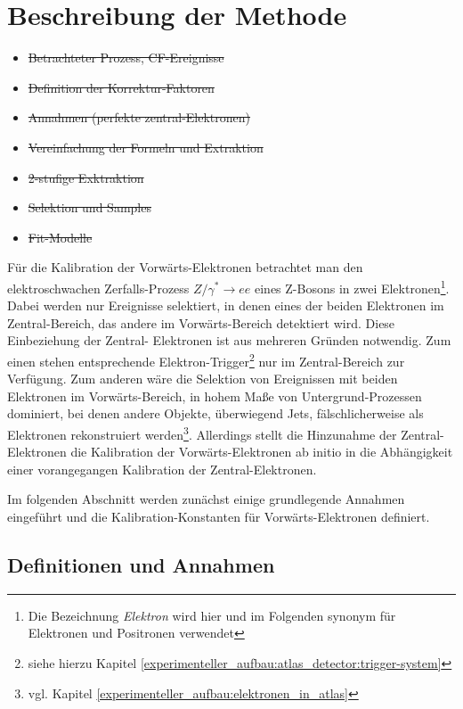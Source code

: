 \section{Beschreibung der Methode}
\label{energy_calibration:beschreibung_der_methode}

\begin{itemize}
    \item \sout{Betrachteter Prozess, CF-Ereignisse}
    \item \sout{Definition der Korrektur-Faktoren}
    \item \sout{Annahmen (perfekte zentral-Elektronen)}
    \item \sout{Vereinfachung der Formeln und Extraktion}
    \item \sout{2-stufige Exktraktion}
    \item \sout{Selektion und Samples}
    \item \sout{Fit-Modelle}
\end{itemize}

Für die Kalibration der Vorwärts-Elektronen betrachtet man den elektroschwachen
Zerfalls-Prozess $Z/\gamma^* \rightarrow ee$ eines Z-Bosons in zwei
Elektronen\footnote{Die Bezeichnung \textit{Elektron} wird hier und im
Folgenden synonym für Elektronen und Positronen verwendet}. Dabei werden nur
Ereignisse selektiert, in denen eines der beiden Elektronen im Zentral-Bereich,
das andere im Vorwärts-Bereich detektiert wird. Diese Einbeziehung der Zentral-
Elektronen ist aus mehreren Gründen notwendig. Zum einen stehen entsprechende
Elektron-Trigger\footnote{siehe hierzu Kapitel
\ref{experimenteller_aufbau:atlas_detector:trigger-system}}
nur im Zentral-Bereich zur Verfügung. Zum anderen wäre die Selektion von
Ereignissen mit beiden Elektronen im Vorwärts-Bereich, in hohem Maße von
Untergrund-Prozessen dominiert, bei denen andere Objekte, überwiegend Jets,
fälschlicherweise als Elektronen rekonstruiert werden\footnote{vgl. Kapitel
\ref{experimenteller_aufbau:elektronen_in_atlas}}.
Allerdings stellt die Hinzunahme der Zentral-Elektronen die Kalibration der
Vorwärts-Elektronen ab initio in die Abhängigkeit einer vorangegangen 
Kalibration der Zentral-Elektronen.

Im folgenden Abschnitt werden zunächst einige grundlegende Annahmen eingeführt
und die Kalibration-Konstanten für Vorwärts-Elektronen definiert.



\subsection{Definitionen und Annahmen}
\label{energy_calibration:definitionen_und_annahmen}

